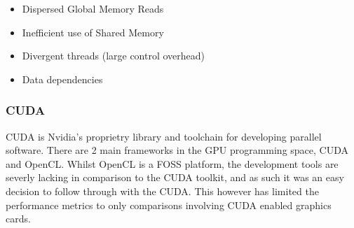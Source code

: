 \begin{itemize}
\item Dispersed Global Memory Reads
\item Inefficient use of Shared Memory
\item Divergent threads (large control overhead)
\item Data dependencies
\end{itemize}


\subsubsection{CUDA}
CUDA is Nvidia's proprietry library and toolchain for developing parallel software. There are 2 main frameworks in the GPU programming space, CUDA and OpenCL. Whilst OpenCL is a FOSS platform, the development tools are severly lacking in comparison to the CUDA toolkit, and as such it was an easy decision to follow through with the CUDA. This however has limited the performance metrics to only comparisons involving CUDA enabled graphics cards.



